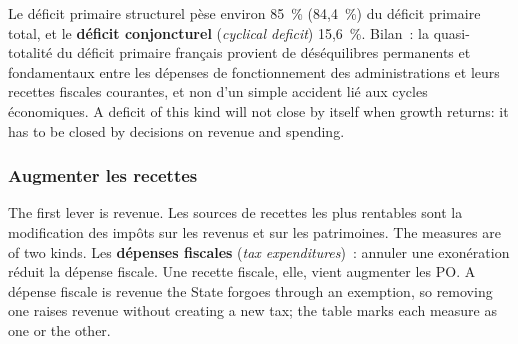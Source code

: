 Le déficit primaire structurel pèse environ 85~\% (84,4~\%) du déficit primaire
total, et le \textbf{déficit conjoncturel} (\textit{cyclical deficit}) 15,6~\%.
Bilan~: la quasi-totalité du déficit primaire français provient de déséquilibres
permanents et fondamentaux entre les dépenses de fonctionnement des
administrations et leurs recettes fiscales courantes, et non d'un simple
accident lié aux cycles économiques. A deficit of this kind will not close by
itself when growth returns: it has to be closed by decisions on revenue and
spending.

\subsubsection{Augmenter les recettes}

The first lever is revenue. Les sources de recettes les plus rentables sont la
modification des impôts sur les revenus et sur les patrimoines. The measures
are of two kinds. Les \textbf{dépenses fiscales} (\textit{tax expenditures})~:
annuler une exonération réduit la dépense fiscale. Une recette fiscale, elle,
vient augmenter les PO. A dépense fiscale is revenue the State forgoes through
an exemption, so removing one raises revenue without creating a new tax; the
table marks each measure as one or the other.\\

